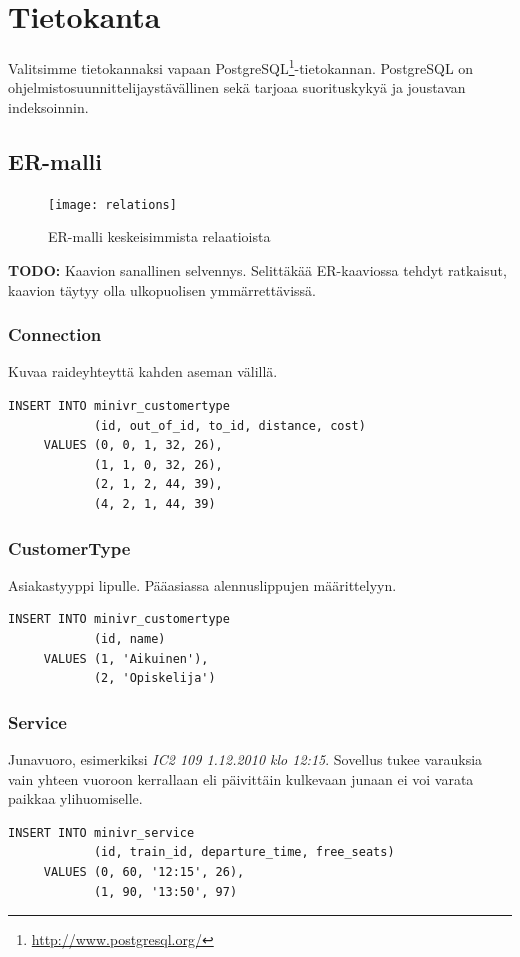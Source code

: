 \documentclass[a4paper,twoside,titlepage,12pt]{article}
\begin{document}
\lstset{language=SQL}

\section{Tietokanta}

Valitsimme tietokannaksi vapaan PostgreSQL\footnote{\url{http://www.postgresql.org/}}-tietokannan. PostgreSQL on ohjelmistosuunnittelijaystävällinen sekä tarjoaa suorituskykyä ja joustavan indeksoinnin.

\subsection{ER-malli}

\begin{figure}
  \texttt{[image: relations]}
  \caption{ER-malli keskeisimmista relaatioista}
\end{figure}

\textbf{TODO:} Kaavion sanallinen selvennys. Selittäkää ER-kaaviossa tehdyt ratkaisut, kaavion täytyy olla ulkopuolisen ymmärrettävissä. 

\subsubsection{Connection}

Kuvaa raideyhteyttä kahden aseman välillä.
\begin{lstlisting}
INSERT INTO minivr_customertype
            (id, out_of_id, to_id, distance, cost)
     VALUES (0, 0, 1, 32, 26),
            (1, 1, 0, 32, 26),
            (2, 1, 2, 44, 39),
            (4, 2, 1, 44, 39)
\end{lstlisting}

\subsubsection{CustomerType}

Asiakastyyppi lipulle. Pääasiassa alennuslippujen määrittelyyn.
\begin{lstlisting}
INSERT INTO minivr_customertype
            (id, name)
     VALUES (1, 'Aikuinen'),
            (2, 'Opiskelija')
\end{lstlisting}

\subsubsection{Service}

Junavuoro, esimerkiksi \emph{IC2 109 1.12.2010 klo 12:15}. Sovellus tukee varauksia vain yhteen vuoroon kerrallaan eli päivittäin kulkevaan junaan ei voi varata paikkaa ylihuomiselle.
\begin{lstlisting}
INSERT INTO minivr_service
            (id, train_id, departure_time, free_seats)
     VALUES (0, 60, '12:15', 26),
            (1, 90, '13:50', 97)
\end{lstlisting}
\end{document}
